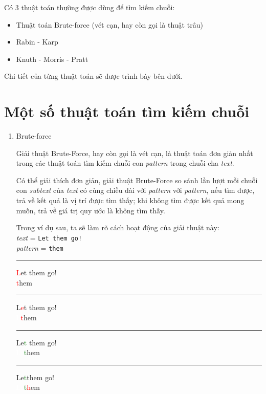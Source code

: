 \documentclass[a4paper,11pt]{article}
\begin{document}
	\vspace*{3mm}
	Có 3 thuật toán thường được dùng để tìm kiếm chuỗi:
	\begin{itemize}
	    \item Thuật toán Brute-force (vét cạn, hay còn gọi là thuật trâu)
	    \item Rabin - Karp
	    \item Knuth - Morris - Pratt
	\end{itemize}
	Chi tiết của từng thuật toán sẽ được trình bày bên dưới.

	\section{Một số thuật toán tìm kiếm chuỗi}
	\begin{enumerate}
		\item Brute-force 
		
			Giải thuật Brute-Force, hay còn gọi là vét cạn, 
			là thuật toán đơn giản nhất trong các thuật toán 
			tìm kiếm chuỗi con \textit{pattern} 
			trong chuỗi cha \textit{text}.

			Có thể giải thích đơn giản, giải thuật Brute-Force 
			so sánh lần lượt mỗi chuỗi con \textit{subtext} của \textit{text} 
			có cùng chiều dài với \textit{pattern} với \textit{pattern}, 
			nếu tìm được, trả về kết quả là vị trí được tìm thấy; khi không 
			tìm được kết quả mong muốn, trả về giá trị quy ước là không tìm thấy.

			Trong ví dụ sau, ta sẽ làm rõ cách hoạt động của giải thuật này:\\
			\textit{text} \hspace*{7mm}= \verb|Let them go!| \\
			\textit{pattern} \hspace*{0.1mm} = \verb|them| 
			\vspace*{4mm}
			\hrule
			\textcolor{red}{L}et them go!\\
			\textcolor{red}{t}hem

			\vspace*{2mm}
			\hrule
			L\textcolor{red}{e}t them go!\\
			\textcolor{white}{L}\textcolor{red}{t}hem
			
			\vspace*{2mm}
			\hrule
			Le\textcolor{ForestGreen}{t} them go!\\
			\textcolor{white}{Le}\textcolor{ForestGreen}{t}hem
			
			\vspace*{2mm}
			\hrule
			Le\textcolor{ForestGreen}{t}\textcolor{red}{\textvisiblespace}them go!\\
			\textcolor{white}{Le}\textcolor{ForestGreen}{t}\textcolor{red}{h}em


\end{enumerate}
\end{document}
